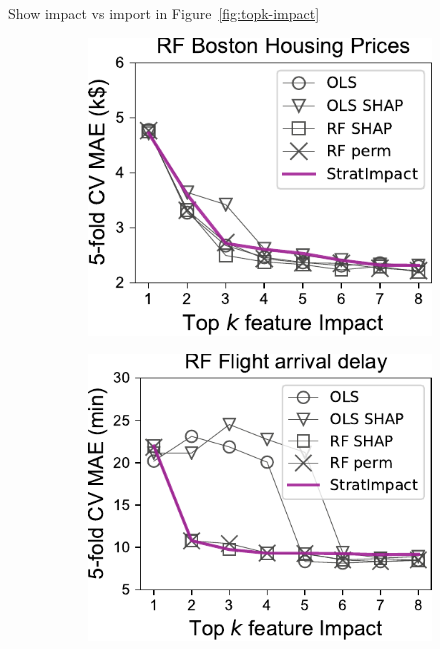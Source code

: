 \documentclass[11pt]{article}
\newcommand{\figref}[1]{Figure~\ref{#1}}
\begin{document}
Show impact vs import in \figref{fig:topk-impact}

\begin{figure}
\centering
\begin{subfigure}{.245\textwidth}
    \centering
\includegraphics[scale=0.45]{images/boston-topk-RF-Impact.pdf}
\end{subfigure}%
\hfill
\begin{subfigure}{.245\textwidth}
    \centering
\includegraphics[scale=0.45]{images/flights-topk-RF-Impact.pdf}
\end{subfigure}

\end{figure}
\end{document}
